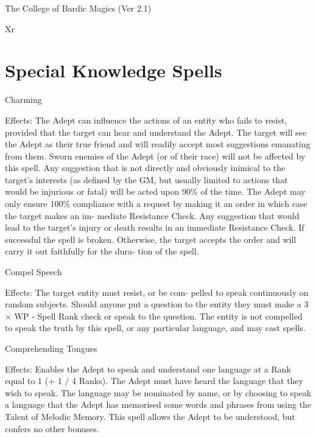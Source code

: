 \begin{Chapter}{The College of Bardic Magics (Ver 2.1)}
\begin{tarularx}{\columnwidth}{Xr}
\section{Special Knowledge Spells}

\begin{spell}[S-1]{Charming }

Effects: The  Adept can influence the actions of an 
entity  who  fails  to  resist,  provided  that  the  target 
can hear and understand the Adept. The target will 
see  the  Adept  as  their  true  friend  and  will  readily 
accept  most  suggestions  emanating  from  them. 
Sworn enemies of the Adept (or of their race) will 
not be affected by this spell. Any suggestion that is 
not  directly  and  obviously  inimical  to  the  target’s 
interests (as defined by the GM, but usually limited 
to  actions that  would  be  injurious  or  fatal)  will  be 
acted upon  90\%  of  the  time.  The  Adept  may  only 
ensure 100\% compliance with a request by making 
it  an  order  in  which  case  the  target  makes  an  im-
mediate  Resistance  Check.  Any  suggestion  that 
would lead to the target’s injury or death results in 
an  immediate  Resistance  Check.  If  successful  the 
spell  is  broken.  Otherwise,  the  target  accepts  the 
order  and  will  carry  it  out  faithfully  for  the  dura-
tion of the spell. 
\end{spell}

\begin{spell}[S-2]{Compel Speech }

Effects:  The  target  entity  must  resist,  or  be  com-
pelled  to  speak  continuously  on  random  subjects. 
Should  anyone  put  a  question  to  the  entity  they 
must make a 3 × WP  - Spell Rank check or speak 
to  the  question.  The  entity  is  not  compelled  to 
speak the truth by this spell, or any  particular language, and may cast spells. 
\end{spell}

\begin{spell}[S-3]{Comprehending Tongues }

Effects: Enables the Adept to speak and understand 
one language at a Rank equal to 1 (+ 1 / 4 Ranks). 
The Adept must have heard the language that they 
wish to speak. The language may be nominated by 
name, or by choosing to speak a language that the 
Adept  has  memorised  some  words  and  phrases 
from  using  the  Talent  of  Melodic  Memory.  This 
spell  allows  the  Adept  to  be  understood,  but  confers no other bonuses. 
\end{spell}


\end{tarularx}
\end{Chapter}
